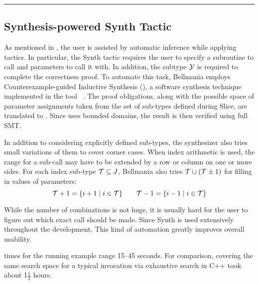 \medskip
\hrule
\medskip

\subsection{Synthesis-powered {\sf Synth} Tactic}
\label{tactics:synthesis}

As mentioned in , the user is assisted by automatic
inference while applying tactics. In particular, the {\sf Synth} tactic requires
the user to specify a subroutine to call and parameters to call it with.
In addition, the subtype $\mathcal{Y}$ is required to complete the correctness proof.
To automate this task, Bellmania employs Counterexample-guided Inductive Synthesis ({\cegis}), a software synthesis technique
implemented in the tool {\Sketch}~\cite{STTT13/Solar-Lezama}. The proof obligations, along with the possible
space of parameter assignments taken from the set of sub-types defined during
{\sf Slice}, are translated to {\Sketch}. Since {\Sketch} uses bounded domains,
the result is then verified using full SMT.

In addition to considering explicitly defined sub-types, the synthesizer also tries
small variations of them to cover corner cases. When index arithmetic is used,
the range for a sub-call may have to be extended by a row or column on one or more sides.
For each index sub-type $\mathcal{T}\subseteq J$, Bellmania also tries $\mathcal{T}\cup(\mathcal{T}\pm 1)$ for filling in values of parameters:
\[\mathcal{T}+1=\{i+1\;|\;i\in \mathcal{T}\} \qquad \mathcal{T}-1=\{i-1\;|\;i\in \mathcal{T}\}\]

While the number of combinations is not huge, 
it is usually hard for the user to figure out which exact call
should be made. Since {\sf Synth} is used extensively throughout the development,
This kind of automation greatly improves overall usability.

{\Sketch} times for the running example range 15--45 seconds.
For comparison, covering the same search space for a typical invocation via exhaustive search in C++ took about 1$\frac{1}{2}$ hours.

